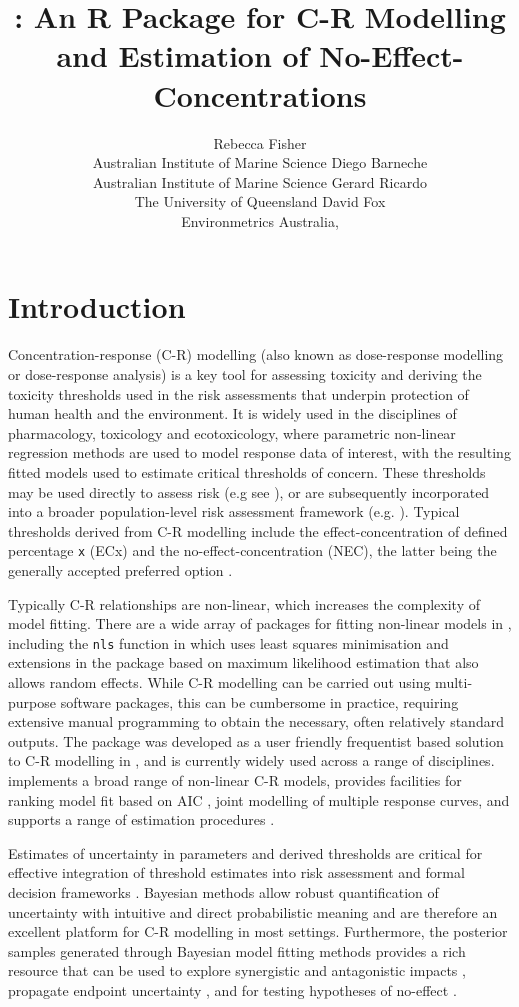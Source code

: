 \documentclass[
]{jss}
\author{
Rebecca Fisher\\Australian Institute of Marine Science \And Diego
Barneche\\Australian Institute of Marine Science \And Gerard
Ricardo\\The University of Queensland \And David Fox\\Environmetrics
Australia,
}
\title{\pkg{bayesnec}: An R Package for C-R Modelling and Estimation of
No-Effect-Concentrations}
\begin{document}
\hypertarget{introduction}{%
\section{Introduction}\label{introduction}}

Concentration-response (C-R) modelling (also known as dose-response
modelling or dose-response analysis) is a key tool for assessing
toxicity and deriving the toxicity thresholds used in the risk
assessments that underpin protection of human health and the
environment. It is widely used in the disciplines of pharmacology,
toxicology and ecotoxicology, where parametric non-linear regression
methods are used to model response data of interest, with the resulting
fitted models used to estimate critical thresholds of concern. These
thresholds may be used directly to assess risk (e.g see
\citep{fisher2018c}), or are subsequently incorporated into a broader
population-level risk assessment framework (e.g. \citep{Warne2015}).
Typical thresholds derived from C-R modelling include the
effect-concentration of defined percentage \texttt{x} (ECx) and the
no-effect-concentration (NEC), the latter being the generally accepted
preferred option \citep{Fox2008, Warne2015}.

Typically C-R relationships are non-linear, which increases the
complexity of model fitting. There are a wide array of packages for
fitting non-linear models in , including the \texttt{nls}
function in  which uses least squares minimisation and
extensions in the  \citep{pinheiro2021} package based on
maximum likelihood estimation that also allows random effects. While C-R
modelling can be carried out using multi-purpose software packages, this
can be cumbersome in practice, requiring extensive manual programming to
obtain the necessary, often relatively standard outputs. The 
package \citep{Ritz2016} was developed as a user friendly frequentist
based solution to C-R modelling in , and is currently widely
used across a range of disciplines.  implements a broad range
of non-linear C-R models, provides facilities for ranking model fit
based on AIC \citep{Burnham2002}, joint modelling of multiple response
curves, and supports a range of estimation procedures \citep{Ritz2016}.

Estimates of uncertainty in parameters and derived thresholds are
critical for effective integration of threshold estimates into risk
assessment and formal decision frameworks \citep{fisher2018c}. Bayesian
methods allow robust quantification of uncertainty with intuitive and
direct probabilistic meaning \citep{Ellison1996} and are therefore an
excellent platform for C-R modelling in most settings. Furthermore, the
posterior samples generated through Bayesian model fitting methods
provides a rich resource that can be used to explore synergistic and
antagonistic impacts \citep{Fisher2019d, flores2021}, propagate endpoint
uncertainty \citep{Charles2020a, Gottschalk2013}, and for testing
hypotheses of no-effect \citep{Thomas2006}.
\end{document}
